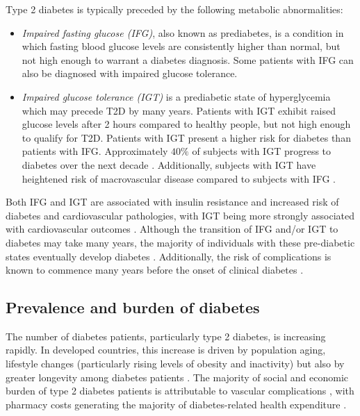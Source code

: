 Type 2 diabetes is typically preceded by the following metabolic abnormalities:
\begin{itemize}
\item \emph{Impaired fasting glucose (IFG)}, also known as prediabetes, is a condition in which fasting blood glucose levels are consistently higher than normal, but not high enough to warrant a diabetes diagnosis. Some patients with IFG can also be diagnosed with impaired glucose tolerance.
\item \emph{Impaired glucose tolerance (IGT)} is a prediabetic state of hyperglycemia which may precede T2D by many years. Patients with IGT exhibit raised glucose levels after 2 hours compared to healthy people, but not high enough to qualify for T2D. Patients with IGT present a higher risk for diabetes than patients with IFG. Approximately $40\%$ of subjects with IGT progress to diabetes over the next decade \citep{zimmet2001global}. Additionally, subjects with IGT have heightened risk of macrovascular disease compared to subjects with IFG \citep{tominaga1999impaired, unwin2002impaired}.
\end{itemize}
Both IFG and IGT are associated with insulin resistance and increased risk of diabetes and cardiovascular pathologies, with IGT being more strongly associated with cardiovascular outcomes \citep{unwin2002impaired}. Although the transition of IFG and/or IGT to diabetes may take many years, the majority of individuals with these pre-diabetic states eventually develop diabetes \cite{tuomilehto2001prevention,diabetes2002reduction,nathan2007impaired}. Additionally, the risk of complications is known to commence many years before the onset of clinical diabetes \cite{haffner1990cardiovascular,zimmet2001global}.


\subsection{Prevalence and burden of diabetes}
The number of diabetes patients, particularly type 2 diabetes, is increasing rapidly. In developed countries, this increase is driven by population aging, lifestyle changes (particularly rising levels of obesity and inactivity) but also by greater longevity among diabetes patients \citep{stovring2003rising,beulens2010global}. The majority of social and economic burden of type 2 diabetes patients is attributable to vascular complications \citep{beulens2010global}, with pharmacy costs generating the majority of diabetes-related health expenditure \citep{nichols2002impact, gandra2006total}.

